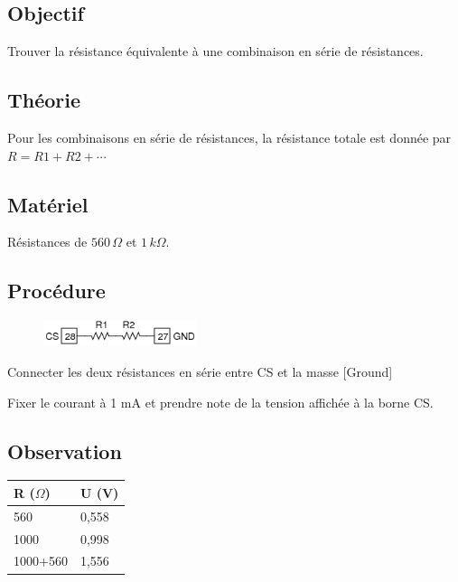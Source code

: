 \documentclass{book}
\begin{document}
\subsection{Objectif}


Trouver la résistance équivalente à une combinaison en série de résistances.

\subsection{Théorie}


Pour les combinaisons en série de résistances, la résistance totale est donnée par $R=R1+R2+\cdots$

\subsection{Matériel}


Résistances de $560\,\Omega$  et $1\, k\Omega$.

\subsection{Procédure}


\begin{figure}[h!]
\begin{center}
\includegraphics[width=0.4\textwidth, height=0.3\textwidth, keepaspectratio]{Schematic-res-series.png}
\end{center}
\end{figure}



Connecter les deux résistances en série entre CS et la masse [Ground]



Fixer le courant à 1 mA et prendre note de la tension affichée à la borne CS.

\subsection{Observation}


\begin{tabular}{|l|l|}
\hline
\textbf{R ($\Omega$)}&\textbf{U (V)}
\\ \hline
560&0,558
\\ \hline
1000&0,998
\\ \hline
1000+560&1,556
\\ \hline
\end{tabular}\\[0.5em]
\end{document}

